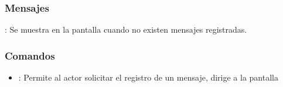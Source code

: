 \subsubsection{Mensajes}

\begin{Citemize}
	\item {}: Se muestra en la pantalla  cuando no existen mensajes registradas.
\end{Citemize}


\label{IU10A}
\subsubsection{Comandos}
\begin{itemize}
	\item {}: Permite al actor solicitar el registro de un mensaje, dirige a la pantalla 
\end{itemize}